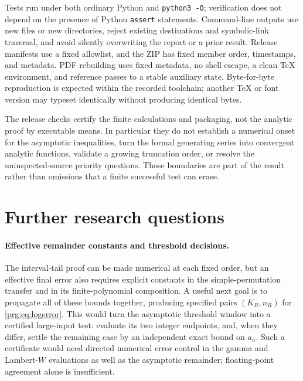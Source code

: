 \documentclass[11pt,letterpaper]{article}
\numberwithin{equation}{section}
\theoremstyle{definition}\newtheorem{definition}[theorem]{Definition}
\theoremstyle{remark}\newtheorem{remark}[theorem]{Remark}
\begin{document}
Tests run under both ordinary Python and \texttt{python3 -O};
verification does not depend on the presence of Python
\texttt{assert} statements. Command-line outputs use new files or
new directories, reject existing destinations and symbolic-link
traversal, and avoid silently overwriting the report or a prior
result. Release manifests use a fixed allowlist, and the ZIP has
fixed member order, timestamps, and metadata. PDF rebuilding uses
fixed metadata, no shell escape, a clean TeX environment, and
reference passes to a stable auxiliary state. Byte-for-byte
reproduction is expected within the recorded toolchain; another
TeX or font version may typeset identically without producing
identical bytes.

The release checks certify the finite calculations and packaging,
not the analytic proof by executable means. In particular they do
not establish a numerical onset for the asymptotic inequalities,
turn the formal generating series into convergent analytic
functions, validate a growing truncation order, or resolve the
uninspected-source priority questions. Those boundaries are part
of the result rather than omissions that a finite successful test
can erase.

\section{Further research questions}\label{prg:sec:future}

\paragraph{Effective remainder constants and threshold decisions.}
The interval-tail proof can be made numerical at each fixed order,
but an effective final error also requires explicit constants in
the simple-permutation transfer and in its finite-polynomial
composition. A useful next goal is to propagate all of these bounds
together, producing specified pairs $(K_R,n_R)$ for
\eqref{prg:eq:logerror}. This would turn the asymptotic threshold window
into a certified large-input test: evaluate its two integer endpoints,
and, when they differ, settle the remaining case by an independent
exact bound on $a_n$. Such a certificate would need directed numerical
error control in the gamma and Lambert-$W$ evaluations as well as
the asymptotic remainder; floating-point agreement alone is
insufficient.
\end{document}
